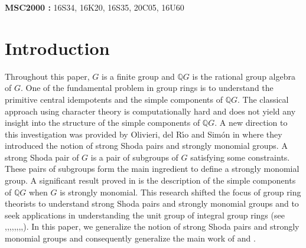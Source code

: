 \documentclass[12pt,a4paper]{article}
\begin{document}
{\bf MSC2000 :} 16S34, 16K20, 16S35, 20C05, 16U60\section{Introduction}Throughout this paper, $G$ is a finite group and  $\mathbb{Q}G$ is the rational group algebra of $G$. One of the fundamental problem in group rings is to understand the primitive central idempotents and the simple components of $ \mathbb{Q}G$. The classical approach using character theory is computationally hard and does not yield any insight into the  structure of the simple components of $\mathbb{Q}G$. A new direction to this investigation was provided by Olivieri, del R{\'{\i}}o and Sim{\'o}n in \cite{OdRS04} where they introduced the notion of strong Shoda pairs and strongly monomial groups. A strong Shoda pair of $G$ is a pair of subgroups of $G$ satisfying some constraints. These pairs of subgroups form the main ingredient to define a strongly monomial group. A significant result proved in \cite{OdRS04} is the description of the simple components of $ \mathbb{Q}G$ when $G$ is strongly monomial. This research shifted the focus of group ring theorists to understand strong Shoda pairs and strongly monomial groups and to seek applications in understanding the unit group of integral group rings (see \cite{Ba},\cite{BK},\cite{BM},\cite{BM1},\cite{BMP},\cite{JOdRVG1},\cite{JOdRVG},\cite{JP},\cite{M}). In this paper, we generalize the notion of strong Shoda pairs and strongly monomial groups  and consequently generalize the main work of \cite{JOdRVG} and \cite{OdRS04}. \par
\end{document}
